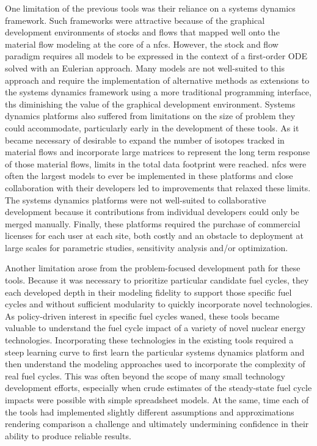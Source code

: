 One limitation of the previous tools was their reliance on a systems dynamics
framework.  Such frameworks were attractive because of the graphical
development environments of stocks and flows that mapped well onto the
material flow modeling at the core of a \gls{nfcs}.  However, the stock and
flow paradigm requires all models to be expressed in the context of a
first-order ODE solved with an Eulerian approach.  Many models are not
well-suited to this approach and require the implementation of alternative
methods as extensions to the systems dynamics framework using a more
traditional programming interface, ths diminishing the value of the graphical
development environment.  Systems dynamics platforms also suffered from
limitations on the size of problem they could accommodate, particularly early
in the development of these tools.  As it became necessary of desirable to
expand the number of isotopes tracked in material flows and incorporate large
matrices to represent the long term response of those material flows, limits
in the total data footprint were reached.  \gls{nfcs} were often the largest
models to ever be implemented in these platforms and close collaboration with
their developers led to improvements that relaxed these limits.  The systems
dynamics platforms were not well-suited to collaborative development because
it contributions from individual developers could only be merged manually.
Finally, these platforms required the purchase of commercial licenses for each
user at each site, both costly and an obstacle to deployment at large scales
for parametric studies, sensitivity analysis and/or optimization.

Another limitation arose from the problem-focused development path for these
tools.  Because it was necessary to prioritize particular candidate fuel
cycles, they each developed depth in their modeling fidelity to support those
specific fuel cycles and without sufficient modularity to quickly incorporate
novel technologies.  As policy-driven interest in specific fuel cycles waned,
these tools became valuable to understand the fuel cycle impact of a variety
of novel nuclear energy technologies.  Incorporating these technologies in the
existing tools required a steep learning curve to first learn the particular
systems dynamics platform and then understand the modeling approaches used to
incorporate the complexity of real fuel cycles.  This was often beyond the
scope of many small technology development efforts, especially when crude
estimates of the steady-state fuel cycle impacts were possible with simple
spreadsheet models.  At the same, time each of the tools had implemented
slightly different assumptions and approximations rendering comparison a
challenge and ultimately undermining confidence in their ability to produce
reliable results.

